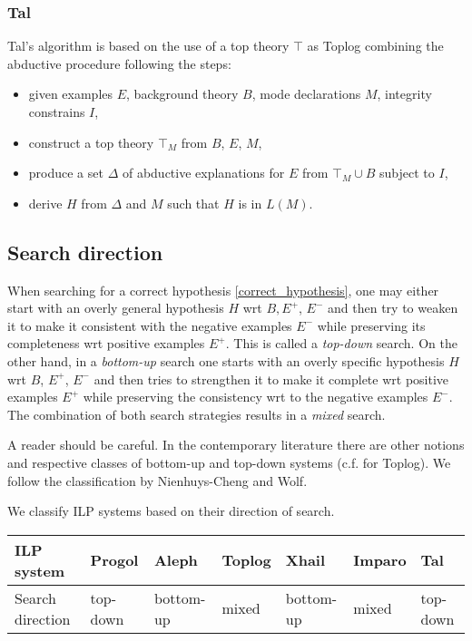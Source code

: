 \subsubsection{Tal\cite{corapi2011nonmonotonic}}
Tal's algorithm is based on the use of a top theory $\top$ as Toplog combining the abductive procedure following the steps:
\begin{itemize}
\item given examples $E$, background theory $B$, mode declarations $M$, integrity constrains $I$,
\item construct a top theory $\top_M$ from $B$, $E$, $M$,
\item produce a set $\Delta$ of abductive explanations for $E$ from $\top_M \cup B$ subject to $I$,
\item derive $H$ from $\Delta$ and $M$ such that $H$ is in $L(M)$.
\end{itemize}

\subsection{Search direction\cite{nienhuys1997foundations}}
When searching for a correct hypothesis \ref{correct_hypothesis}, one may either start with an overly general hypothesis $H$ wrt $B, E^+$, $E^-$ and then try to weaken it to make it consistent with the negative examples $E^-$ while preserving its completeness wrt positive examples $E^+$. This is called a \emph{top-down} search.
On the other hand, in a \emph{bottom-up} search one starts with an overly specific hypothesis $H$ wrt $B$, $E^+$, $E^-$ and then tries to strengthen it to make it complete wrt positive examples $E^+$ while preserving the consistency wrt to the negative examples $E^-$.
The combination of both search strategies results in a \emph{mixed} search.

\begin{remark}
A reader should be careful. In the contemporary literature there are other notions and respective classes of bottom-up and top-down systems (c.f.\cite{corapi2010inductive} for Toplog). We follow the classification by Nienhuys-Cheng and Wolf\cite{nienhuys1997foundations}.
\end{remark}

We classify ILP systems based on their direction of search.

\begin{center}
\label{tab:title} 
\begin{tabular}{| l | l | l | l | l | l | l |}
    \hline
    ILP system & Progol & Aleph & Toplog & Xhail & Imparo & Tal \\ \hline
   	Search direction & top-down & bottom-up& mixed & bottom-up & mixed & top-down\\ \hline
\end{tabular}
\end{center}

